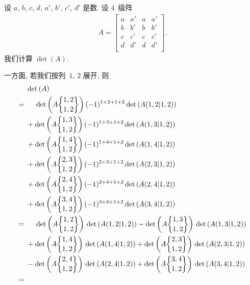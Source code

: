 \documentclass[../libro.tex]{subfiles}
\begin{document}
\begin{example}
    设 \(a\), \(b\), \(c\), \(d\),
    \(a'\), \(b'\), \(c'\), \(d'\) 是数.
    设 \(4\)~级阵
    \begin{align*}
        A =
        \begin{bmatrix}
            a & a' & a & a' \\
            b & b' & b & b' \\
            c & c' & c & c' \\
            d & d' & d & d' \\
        \end{bmatrix}.
    \end{align*}
    我们计算 \(\det {(A)}\).

    一方面, 若我们按列~\(1\), \(2\) 展开, 则
    \begin{align*}
        &
        \det {(A)}
        \\
        = {} &
        \hphantom{{} + {}}
        \det {\left( A\submat{1,2}{1,2} \right)}\,
        (-1)^{1+2+1+2} \det {(A(1,2|1,2))}
        \\
        & + \det {\left( A\submat{1,3}{1,2} \right)}\,
        (-1)^{1+3+1+2} \det {(A(1,3|1,2))}
        \\
        & + \det {\left( A\submat{1,4}{1,2} \right)}\,
        (-1)^{1+4+1+2} \det {(A(1,4|1,2))}
        \\
        & + \det {\left( A\submat{2,3}{1,2} \right)}\,
        (-1)^{2+3+1+2} \det {(A(2,3|1,2))}
        \\
        & + \det {\left( A\submat{2,4}{1,2} \right)}\,
        (-1)^{2+4+1+2} \det {(A(2,4|1,2))}
        \\
        & + \det {\left( A\submat{3,4}{1,2} \right)}\,
        (-1)^{3+4+1+2} \det {(A(3,4|1,2))}
        \\
        = {} &
        \hphantom{{} + {}}
        \det {\left( A\submat{1,2}{1,2} \right)}\,
        \det {(A(1,2|1,2))}
        - \det {\left( A\submat{1,3}{1,2} \right)}\,
        \det {(A(1,3|1,2))}
        \\
        & + \det {\left( A\submat{1,4}{1,2} \right)}\,
        \det {(A(1,4|1,2))}
        + \det {\left( A\submat{2,3}{1,2} \right)}\,
        \det {(A(2,3|1,2))}
        \\
        & - \det {\left( A\submat{2,4}{1,2} \right)}\,
        \det {(A(2,4|1,2))}
        + \det {\left( A\submat{3,4}{1,2} \right)}\,
        \det {(A(3,4|1,2))}
        \\
        = {} &
        \hphantom{{} + {}}

\end{align*}
\end{example}
\end{document}
